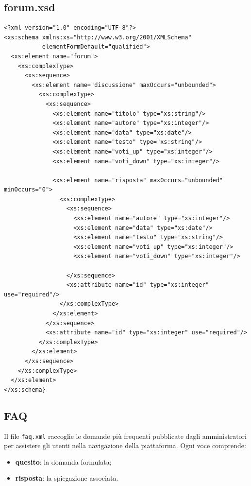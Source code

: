\documentclass[a4paper,12pt]{report}
\begin{document}
\subsection*{forum.xsd}
{\footnotesize
\begin{lstlisting}
<?xml version="1.0" encoding="UTF-8"?>
<xs:schema xmlns:xs="http://www.w3.org/2001/XMLSchema"
           elementFormDefault="qualified">
  <xs:element name="forum">
    <xs:complexType>
      <xs:sequence>
        <xs:element name="discussione" maxOccurs="unbounded">
          <xs:complexType>
            <xs:sequence>
              <xs:element name="titolo" type="xs:string"/>
              <xs:element name="autore" type="xs:integer"/>
              <xs:element name="data" type="xs:date"/>
              <xs:element name="testo" type="xs:string"/>
              <xs:element name="voti_up" type="xs:integer"/>
              <xs:element name="voti_down" type="xs:integer"/>

              <xs:element name="risposta" maxOccurs="unbounded" minOccurs="0">
                <xs:complexType>
                  <xs:sequence>
                    <xs:element name="autore" type="xs:integer"/>
                    <xs:element name="data" type="xs:date"/>
                    <xs:element name="testo" type="xs:string"/>
                    <xs:element name="voti_up" type="xs:integer"/>
                    <xs:element name="voti_down" type="xs:integer"/>

                  </xs:sequence>
                  <xs:attribute name="id" type="xs:integer" use="required"/>
                </xs:complexType>
              </xs:element>
            </xs:sequence>
            <xs:attribute name="id" type="xs:integer" use="required"/>
          </xs:complexType>
        </xs:element>
      </xs:sequence>
    </xs:complexType>
  </xs:element>
</xs:schema}
\end{lstlisting}
}


\subsection*{FAQ}
\label{sec:xml-faq}

Il file \texttt{faq.xml} raccoglie le domande più frequenti pubblicate dagli amministratori
per assistere gli utenti nella navigazione della piattaforma.
Ogni voce comprende:

\begin{itemize}
    \item \textbf{quesito}: la domanda formulata;
    \item \textbf{risposta}: la spiegazione associata.
\end{itemize}
\end{document}

